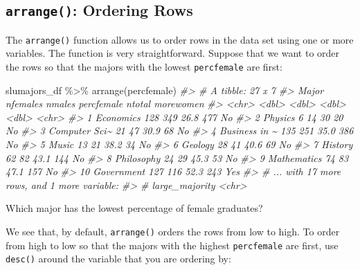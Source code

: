 \documentclass[
]{book}
\newenvironment{Shaded}{\begin{snugshade}}{\end{snugshade}}
\newcommand{\CommentTok}[1]{\textcolor[rgb]{0.56,0.35,0.01}{\textit{#1}}}
\newcommand{\FunctionTok}[1]{\textcolor[rgb]{0.00,0.00,0.00}{#1}}
\newcommand{\NormalTok}[1]{#1}
\newcommand{\SpecialCharTok}[1]{\textcolor[rgb]{0.00,0.00,0.00}{#1}}
\begin{document}
\hypertarget{arrange-ordering-rows}{%
\subsection{\texorpdfstring{\texttt{arrange()}: Ordering Rows}{arrange(): Ordering Rows}}\label{arrange-ordering-rows}}

The \texttt{arrange()} function allows us to order rows in the data set using one or more variables. The function is very straightforward. Suppose that we want to order the rows so that the majors with the lowest \texttt{percfemale} are first:

\begin{Shaded}
\begin{Highlighting}[]
\NormalTok{slumajors\_df }\SpecialCharTok{\%\textgreater{}\%} \FunctionTok{arrange}\NormalTok{(percfemale)}
\CommentTok{\#\textgreater{} \# A tibble: 27 x 7}
\CommentTok{\#\textgreater{}    Major         nfemales nmales percfemale ntotal morewomen}
\CommentTok{\#\textgreater{}    \textless{}chr\textgreater{}            \textless{}dbl\textgreater{}  \textless{}dbl\textgreater{}      \textless{}dbl\textgreater{}  \textless{}dbl\textgreater{} \textless{}chr\textgreater{}    }
\CommentTok{\#\textgreater{}  1 Economics          128    349       26.8    477 No       }
\CommentTok{\#\textgreater{}  2 Physics              6     14       30       20 No       }
\CommentTok{\#\textgreater{}  3 Computer Sci\textasciitilde{}       21     47       30.9     68 No       }
\CommentTok{\#\textgreater{}  4 Business in \textasciitilde{}      135    251       35.0    386 No       }
\CommentTok{\#\textgreater{}  5 Music               13     21       38.2     34 No       }
\CommentTok{\#\textgreater{}  6 Geology             28     41       40.6     69 No       }
\CommentTok{\#\textgreater{}  7 History             62     82       43.1    144 No       }
\CommentTok{\#\textgreater{}  8 Philosophy          24     29       45.3     53 No       }
\CommentTok{\#\textgreater{}  9 Mathematics         74     83       47.1    157 No       }
\CommentTok{\#\textgreater{} 10 Government         127    116       52.3    243 Yes      }
\CommentTok{\#\textgreater{} \# ... with 17 more rows, and 1 more variable:}
\CommentTok{\#\textgreater{} \#   large\_majority \textless{}chr\textgreater{}}
\end{Highlighting}
\end{Shaded}

Which major has the lowest percentage of female graduates?

We see that, by default, \texttt{arrange()} orders the rows from low to high. To order from high to low so that the majors with the highest \texttt{percfemale} are first, use \texttt{desc()} around the variable that you are ordering by:
\end{document}
